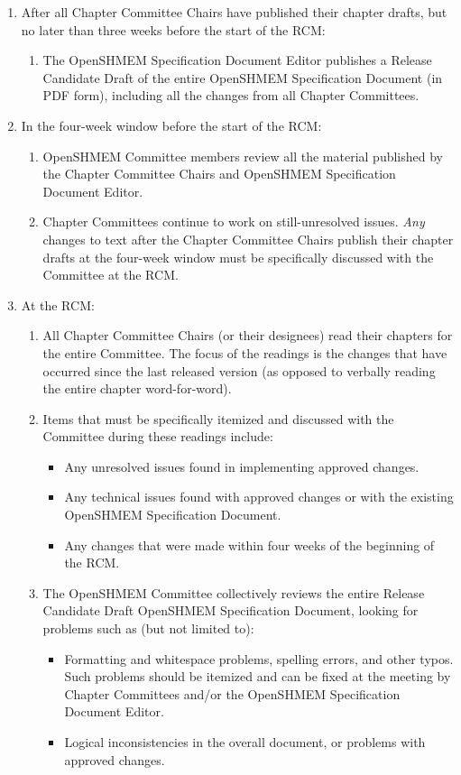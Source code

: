 \begin{enumerate}
\item After all Chapter Committee Chairs have published their chapter
  drafts, but no later than three weeks before the start of the RCM:
  \begin{enumerate}
  \item The OpenSHMEM Specification Document Editor publishes a Release Candidate
    Draft of the entire OpenSHMEM Specification Document (in PDF form), including
    all the changes from all Chapter Committees.
  \end{enumerate}

\item In the four-week window before the start of the RCM:
  \begin{enumerate}
  \item OpenSHMEM Committee members review all the material published by the
    Chapter Committee Chairs and OpenSHMEM Specification Document Editor.
  \item Chapter Committees continue to work on still-unresolved
    issues.  {\em Any} changes to text after the Chapter
      Committee Chairs publish their chapter drafts at the four-week
    window must be specifically discussed with the Committee at the RCM.
  \end{enumerate}

\item At the RCM:
  \begin{enumerate}
  \item All Chapter Committee Chairs (or their designees) read their
    chapters for the entire Committee.  The focus of the readings is the
    changes that have occurred since the last released version (as
    opposed to verbally reading the entire chapter word-for-word).
  \item Items that must be specifically itemized and discussed with
    the Committee during these readings include:
    \begin{itemize}
    \item Any unresolved issues found in implementing approved
      changes.
    \item Any technical issues found with approved changes or with the
      existing OpenSHMEM Specification Document.
    \item Any changes that were made within four weeks of the
      beginning of the RCM.
    \end{itemize}

  \item The OpenSHMEM Committee collectively reviews the entire Release
    Candidate Draft OpenSHMEM Specification Document, looking for problems such
    as (but not limited to):
    \begin{itemize}
    \item Formatting and whitespace problems, spelling errors, and
      other typos.  Such problems should be itemized and can be fixed
      at the meeting by Chapter Committees and/or the OpenSHMEM Specification
      Document Editor.
    \item Logical inconsistencies in the overall document, or problems
      with approved changes.
    \end{itemize}


\end{enumerate}
\end{enumerate}
